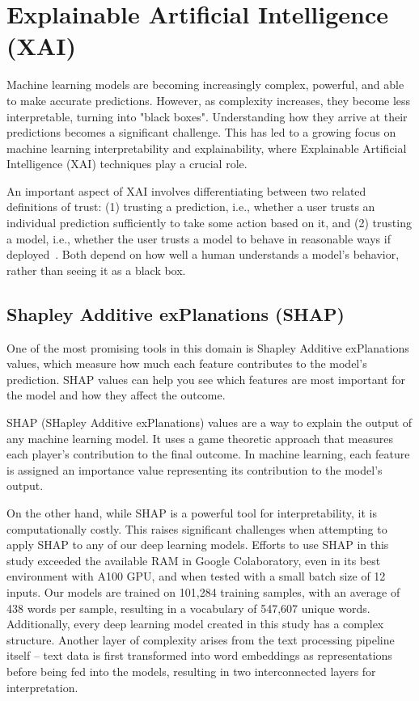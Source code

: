\chapter{Explainable Artificial Intelligence (XAI)}
\label{07_XAI}
\thispagestyle{empty}

Machine learning models are becoming increasingly complex, powerful, and able to make accurate predictions. However, as complexity increases, they become less interpretable, turning into "black boxes". Understanding how they arrive at their predictions becomes a significant challenge. This has led to a growing focus on machine learning interpretability and explainability, where Explainable Artificial Intelligence (XAI) techniques play a crucial role. 

\vspace{3mm}

An important aspect of XAI involves differentiating between two related definitions of trust: (1) trusting a prediction, i.e., whether a user trusts an individual prediction sufficiently to take some action based on it, and (2) trusting a model, i.e., whether the user trusts a model to behave in reasonable ways if deployed~\cite{ribeiro2016should}. Both depend on how well a human understands a model's behavior, rather than seeing it as a black box.

\section{Shapley Additive exPlanations (SHAP)}

One of the most promising tools in this domain is Shapley Additive exPlanations values, which measure how much each feature contributes to the model's prediction. SHAP values can help you see which features are most important for the model and how they affect the outcome.

\newpage


SHAP (SHapley Additive exPlanations) values are a way to explain the output of any machine learning model. It uses a game theoretic approach that measures each player's contribution to the final outcome. In machine learning, each feature is assigned an importance value representing its contribution to the model's output. 

\vspace{3mm}

On the other hand, while SHAP is a powerful tool for interpretability, it is computationally costly. This raises significant challenges when attempting to apply SHAP to any of our deep learning models. Efforts to use SHAP in this study exceeded the available RAM in Google Colaboratory, even in its best environment with A100 GPU, and when tested with a small batch size of 12 inputs. Our models are trained on 101,284 training samples, with an average of 438 words per sample, resulting in a vocabulary of 547,607 unique words. Additionally, every deep learning model created in this study has a complex structure. Another layer of complexity arises from the text processing pipeline itself -- text data is first transformed into word embeddings as representations before being fed into the models, resulting in two interconnected layers for interpretation.

